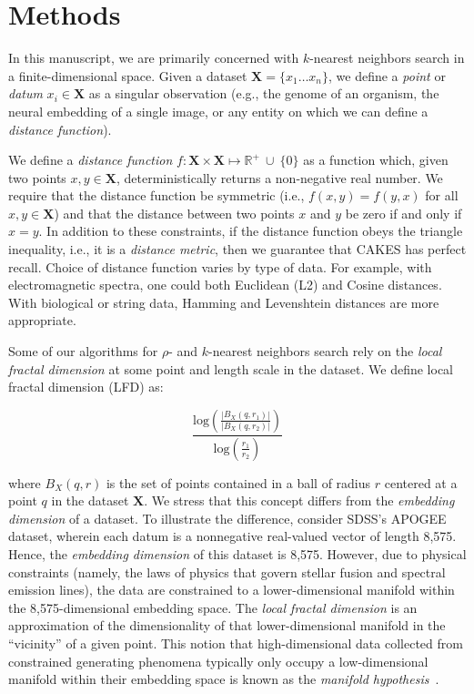 \section{Methods}
\label{sec:methods}

In this manuscript, we are primarily concerned with $k$-nearest neighbors search in a finite-dimensional space.
Given a dataset $\textbf{X} = \{x_1 \dots x_n\}$, we define a \emph{point} or \emph{datum} $x_i \in \textbf{X}$ as a singular observation (e.g., the genome of 
an organism, the neural embedding of a single image, or any entity on which we can define a \emph{distance function}).

We define a \emph{distance function} $f : \textbf{X} \times \textbf{X} \mapsto \mathbb{R}^+ \ \cup \ \{0\}$ as a function which, 
given two points $x, y \in \textbf{X}$, deterministically returns a non-negative real number.
We require that the distance function be symmetric (i.e., $f(x, y) = f(y, x)$ for all $x, y \in \textbf{X}$) and that the distance between two points $x$ and $y$ be zero if and only if $x = y$. 
In addition to these constraints, if the distance function obeys the triangle inequality, i.e., it is a \emph{distance metric}, then we guarantee that CAKES has perfect recall. 
Choice of distance function varies by type of data.
For example, with electromagnetic spectra, one could both Euclidean (L2) and Cosine distances.
With biological or string data, Hamming and Levenshtein distances are more appropriate.

Some of our algorithms for $\rho$- and $k$-nearest neighbors search rely on the \emph{local fractal dimension} at some point and length scale in the dataset.
We define local fractal dimension (LFD) as:

\begin{equation}
    \frac{\text{log}(\frac{|B_X(q, r_1)|}{|B_X(q, r_2)|})}{\text{log}(\frac{r_1}{r_2}) }
    \label{eq:methods:lfd}
\end{equation}

where $B_X(q, r)$ is the set of points contained in a ball of radius $r$ centered at a point $q$ in the dataset $\textbf{X}$.
We stress that this concept differs from the \emph{embedding dimension} of a dataset.
To illustrate the difference, consider SDSS's APOGEE dataset, wherein each datum is a nonnegative real-valued vector of length 8,575.
Hence, the \emph{embedding dimension} of this dataset is 8,575. 
However, due to physical constraints (namely, the laws of physics that govern stellar fusion and spectral emission lines), the data are constrained to a lower-dimensional manifold within the 8,575-dimensional embedding space.
The \emph{local fractal dimension} is an approximation of the dimensionality of that lower-dimensional manifold in the ``vicinity'' of a given point.
This notion that high-dimensional data collected from constrained generating phenomena typically only occupy a low-dimensional manifold within their embedding space is known as the \emph{manifold hypothesis}~\cite{fefferman2016testing}.

